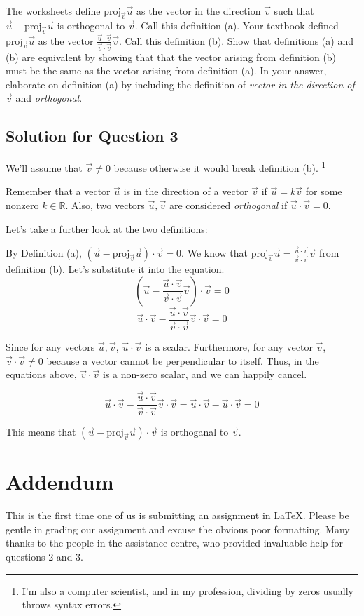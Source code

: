 \documentclass[letter]{article}
\newcommand{\R}{\mathbb{R}}
\newcommand{\Proj}{\mathrm{proj}}
\begin{document}
The worksheets define $\Proj_{\vec v}\vec u$ as the vector in the direction $\vec v$ such that
      $\vec u-\Proj_{\vec v}\vec u$ is orthogonal to $\vec v$.  Call this definition (a).  Your textbook
      defined $\Proj_{\vec v}\vec u$ as the vector $\frac{\vec u\cdot \vec v}{\vec v\cdot\vec v}\vec v$.
      Call this definition (b).  Show that definitions (a) and (b) are equivalent by showing
      that that the vector arising from definition (b) must be the same as the vector
      arising from definition (a).
      In your answer, elaborate on definition (a) by including
      the definition of \emph{vector in the direction of $\vec v$} and \emph{orthogonal}.

\subsection{Solution for Question 3}
    We'll assume that $\vec v \neq 0$ because otherwise it would break definition (b). \footnote{I'm also a computer scientist, and in my profession, dividing by zeros usually throws syntax errors.}

    Remember that a vector $\vec u$ is in the direction of a vector $\vec v$ if $\vec u=k\vec v$ for some nonzero $k \in \R$.
    Also, two vectors $\vec u, \vec v$ are considered \emph{orthogonal} if $\vec u \cdot \vec v = 0$.

   Let's take a further look at the two definitions:

    By Definition (a), $(\vec u-\Proj_{\vec v}\vec u) \cdot \vec v = 0$. We know that $\Proj_{\vec v}\vec u = \frac{\vec u\cdot \vec v}{\vec v\cdot\vec v}\vec v$ from definition (b). Let's substitute it into the equation.
   \[
        (\vec u-\frac{\vec u\cdot \vec v}{\vec v\cdot\vec v}\vec v) \cdot \vec v = 0
    \]
    \[
        \vec u \cdot \vec v - \frac{\vec u\cdot \vec v}{\vec v\cdot\vec v}\vec v \cdot \vec v = 0
    \]

    Since for any vectors $\vec u, \vec v$, $\vec u \cdot \vec v$ is a scalar. Furthermore, for any vector $\vec v$, $\vec v \cdot \vec v \neq 0$ because a vector cannot be perpendicular to itself.
    Thus, in the equations above, $\vec v \cdot \vec v$ is a non-zero scalar, and we can happily cancel.

    \[
        \vec u \cdot \vec v - \frac{\vec u\cdot \vec v}{\vec v\cdot\vec v}\vec v \cdot \vec v = \vec u \cdot \vec v - \vec u \cdot \vec v = 0
    \]

    This means that $(\vec u-\Proj_{\vec v}\vec u) \cdot \vec v$ is orthoganal to $\vec v$.
\section{Addendum}
  This is the first time one of us is submitting an assignment in \LaTeX{}. Please be gentle in grading our assignment and excuse the obvious poor formatting. Many thanks to the people in the assistance centre, who provided invaluable help for questions 2 and 3.
\end{document}
